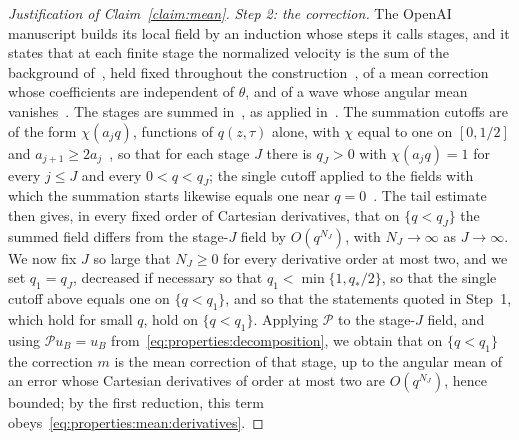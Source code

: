 \documentclass[11pt,reqno]{amsproc}
\numberwithin{equation}{section}
\theoremstyle{remark}
\begin{document}
\begin{proof}[Justification of Claim~\ref{claim:mean}]
\smallskip
\noindent\emph{Step 2: the correction.} The OpenAI manuscript builds its local field by an induction whose steps it calls stages, and it states that at each finite stage the normalized velocity is the sum of the background of~\cite[Proposition~5.5, p.~60]{OpenAIManuscript}, held fixed throughout the construction~\cite[p.~62]{OpenAIManuscript}, of a mean correction whose coefficients are independent of $\theta$, and of a wave whose angular mean vanishes~\cite[equation~(9.7) and Definition~9.4, p.~106, with Definition~6.4, p.~69]{OpenAIManuscript}. The stages are summed in~\cite[Lemma~5.4 and equations~(5.34)--(5.35), pp.~57--58]{OpenAIManuscript}, as applied in~\cite[Proposition~9.9, p.~114]{OpenAIManuscript}. The summation cutoffs are of the form $\chi(a_jq)$, functions of $q(z,\tau)$ alone, with $\chi$ equal to one on $[0,1/2]$ and $a_{j+1}\ge2a_j$~\cite[equation~(9.21), p.~115, and Lemma~5.4, p.~57]{OpenAIManuscript}, so that for each stage $J$ there is $q_J>0$ with $\chi(a_jq)=1$ for every $j\le J$ and every $0<q<q_J$; the single cutoff applied to the fields with which the summation starts likewise equals one near $q=0$~\cite[p.~114, Step~1, and p.~115]{OpenAIManuscript}. The tail estimate~\cite[equation~(5.35), p.~58]{OpenAIManuscript} then gives, in every fixed order of Cartesian derivatives, that on $\{q<q_J\}$ the summed field differs from the stage-$J$ field by $O(q^{N_J})$, with $N_J\to\infty$ as $J\to\infty$. We now fix $J$ so large that $N_J\ge0$ for every derivative order at most two, and we set $q_1=q_J$, decreased if necessary so that $q_1<\min\{1,q_*/2\}$, so that the single cutoff above equals one on $\{q<q_1\}$, and so that the statements quoted in Step~1, which hold for small $q$, hold on $\{q<q_1\}$. Applying $\mathcal P$ to the stage-$J$ field, and using $\mathcal Pu_B=u_B$ from~\eqref{eq:properties:decomposition}, we obtain that on $\{q<q_1\}$ the correction $m$ is the mean correction of that stage, up to the angular mean of an error whose Cartesian derivatives of order at most two are $O(q^{N_J})$, hence bounded; by the first reduction, this term obeys~\eqref{eq:properties:mean:derivatives}.


\end{proof}
\end{document}
